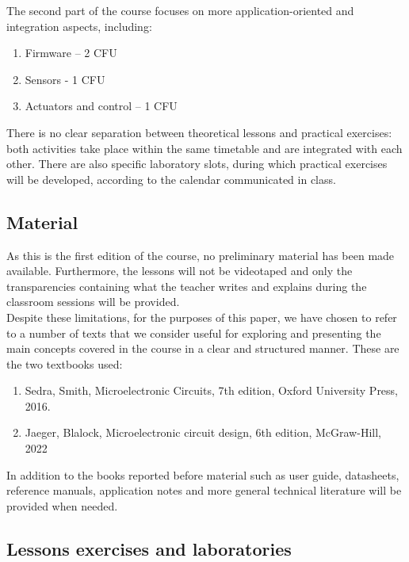 \documentclass[../main.tex]{subfiles}
\begin{document}
The second part of the course focuses on more application-oriented and integration aspects, including:

\begin{enumerate}
	\item[\textbf{-}] Firmware – 2 CFU
	\item[\textbf{-}] Sensors - 1 CFU
	\item[\textbf{-}] Actuators and control – 1 CFU
\end{enumerate}

There is no clear separation between theoretical lessons and practical exercises: both activities take place within the same timetable and are integrated with each other. There are also specific laboratory slots, during which practical exercises will be developed, according to the calendar communicated in class.

\subsection{Material}

As this is the first edition of the course, no preliminary material has been made available. Furthermore, the lessons will not be videotaped and only the transparencies containing what the teacher writes and explains during the classroom sessions will be provided.\\

Despite these limitations, for the purposes of this paper, we have chosen to refer to a number of texts that we consider useful for exploring and presenting the main concepts covered in the course in a clear and structured manner. These are the two textbooks used:

\begin{enumerate}
	\item[\textbf{-}] Sedra, Smith, Microelectronic Circuits, 7th edition, Oxford University Press, 2016.
	\item[\textbf{-}] Jaeger, Blalock, Microelectronic circuit design, 6th edition, McGraw-Hill, 2022
\end{enumerate}

In addition to the books reported before material such as user guide, datasheets, reference manuals, application notes and more general technical literature will be provided when needed.

\subsection{Lessons exercises and laboratories}
\end{document}
